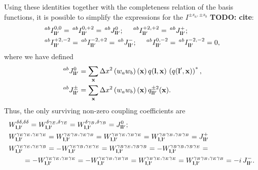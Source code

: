 \documentclass[a4paper,11pt]{article}
\newcommand{\todo}[1]{{\bf TODO: #1}}
\newcommand{\summ}[1]{\sum_{\bf #1}\Delta #1^2}
\begin{document}
      Using these identities together with the completeness relation of the basis functions, it is possible to simplify the expressions for the $I^{\pm s_a,\pm s_b}$ \todo{cite}:
      \begin{align}
        &\,^{ab}I^{0,0}_{{\bf l}{\bf l}'}=\,^{ab}I^{0,+2}_{{\bf l}{\bf l}'}=\,^{ab}J^0_{{\bf l}{\bf l}'}; \hspace{12pt}
        \,^{ab}I^{+2,+2}_{{\bf l}{\bf l}'}=\,^{ab}J^+_{{\bf l}{\bf l}'};\\
        &\,^{ab}I^{+2,-2}_{{\bf l}{\bf l}'}=\,^{ab}I^{-2,+2}_{{\bf l}{\bf l}'}=\,^{ab}J^-_{{\bf l}{\bf l}'}; \hspace{12pt}
        \,^{ab}I^{0,-2}_{{\bf l}{\bf l}'}=\,^{ab}I^{-2,-2}_{{\bf l}{\bf l}'}=0,
      \end{align}
      where  we have defined
      \begin{align}\label{eq:covar_coupling_J}
        &\,^{ab}J^0_{{\bf l}{\bf l}'}=\summ{x}\left(w_a w_b\right)({\bf x})\,q({\bf l},{\bf x})\,\left(q({\bf l}',{\bf x})\right)^*,\\
        &\,^{ab}J^\pm_{{\bf l}{\bf l}'}=\summ{x}\left(w_a w_b\right)({\bf x})\,q^{\pm2}_{{\bf l}{\bf l}'}({\bf x}).
      \end{align}
      Thus, the only surviving non-zero coupling coefficients are
      \begin{align}
        &W^{\delta\delta,\delta\delta}_{{\bf l},{\bf l}'}=W^{\delta\gamma_E,\delta\gamma_E}_{{\bf l},{\bf l}'}=W^{\delta\gamma_B,\delta\gamma_B}_{{\bf l},{\bf l}'}=J^0_{{\bf l}{\bf l}'};\\
        &W^{\gamma_E\gamma_E,\gamma_E\gamma_E}_{{\bf l},{\bf l}'}=W^{\gamma_E\gamma_B,\gamma_E\gamma_B}_{{\bf l},{\bf l}'}=W^{\gamma_B\gamma_E,\gamma_B\gamma_E}_{{\bf l},{\bf l}'}=W^{\gamma_B\gamma_B,\gamma_B\gamma_B}_{{\bf l},{\bf l}'}=J^+_{{\bf l}{\bf l}'}\\\nonumber
        &W^{\gamma_E\gamma_E,\gamma_E\gamma_B}_{{\bf l},{\bf l}'}=-W^{\gamma_E\gamma_B,\gamma_E\gamma_E}_{{\bf l},{\bf l}'}=W^{\gamma_B\gamma_E,\gamma_B\gamma_B}_{{\bf l},{\bf l}'}=-W^{\gamma_B\gamma_B,\gamma_B\gamma_E}_{{\bf l},{\bf l}'}=\\
        &\hspace{20pt}=-W^{\gamma_E\gamma_E,\gamma_B\gamma_E}_{{\bf l},{\bf l}'}=-W^{\gamma_E\gamma_B,\gamma_B\gamma_B}_{{\bf l},{\bf l}'}=W^{\gamma_B\gamma_E,\gamma_E\gamma_E}_{{\bf l},{\bf l}'}=W^{\gamma_B\gamma_B,\gamma_E\gamma_B}_{{\bf l},{\bf l}'}=-i\,J^-_{{\bf l}{\bf l}'}.
      \end{align}
    
\end{document}
